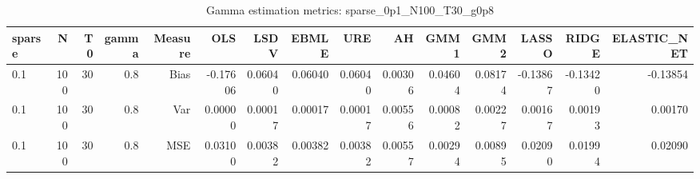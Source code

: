 \begin{table}[!htbp]\centering
\caption{Gamma estimation metrics: sparse_0p1_N100_T30_g0p8}
\label{tab:table1_sparse_0p1_N100_T30_g0p8}
\begin{tabular}{lrrrrrrrrrrrrrr}
\hline
sparse & N & T0 & gamma & Measure & OLS & LSDV & EBMLE & URE & AH & GMM1 & GMM2 & LASSO & RIDGE & ELASTIC_NET \\
\hline
0.1 & 100 & 30 & 0.8 & Bias & -0.17606 & 0.06040 & 0.06040 & 0.06040 & 0.00306 & 0.04604 & 0.08174 & -0.13867 & -0.13420 & -0.13854 \\
0.1 & 100 & 30 & 0.8 & Var & 0.00000 & 0.00017 & 0.00017 & 0.00017 & 0.00556 & 0.00082 & 0.00227 & 0.00167 & 0.00193 & 0.00170 \\
0.1 & 100 & 30 & 0.8 & MSE & 0.03100 & 0.00382 & 0.00382 & 0.00382 & 0.00557 & 0.00294 & 0.00895 & 0.02090 & 0.01994 & 0.02090 \\
\hline
\end{tabular}
\end{table}

